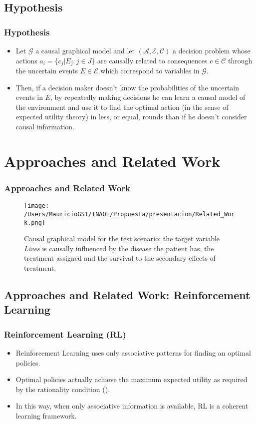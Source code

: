 \documentclass{beamer}
\theoremstyle{plain}
\begin{document}
	\subsection{Hypothesis}
	\begin{frame}
	\frametitle{Hypothesis}
	\begin{itemize}
	\item Let $\mathcal{G}$ a causal graphical model and let $(\mathcal{A},\mathcal{E},\mathcal{C})$ a decision problem whose actions $a_i = \{ c_j | E_j : j \in J \}$  are causally related to consequences $c \in \mathcal{C}$ through the uncertain events $E \in \mathcal{E}$ which correspond to variables in $\mathcal{G}$.
	\item Then, if a decision maker doesn't know the probabilities of the uncertain events in $E$, by repeatedly making decisions he can learn a causal model of the environment and use it to find the optimal action (in the sense of expected utility theory) in less, or equal, rounds than if he doesn't consider causal information.
	\end{itemize}
	\end{frame}

\section{Approaches and Related Work}
\begin{frame}
\frametitle{Approaches and Related Work}
\begin{figure}[ht]
\vskip 0.2in
\begin{center}
\texttt{[image: /Users/MauricioGS1/INAOE/Propuesta/presentacion/Related\_Work.png]}
\caption{Causal graphical model for the test scenario: the target variable \textit{Lives} is causally influenced by the disease the patient has, the treatment assigned and the survival to the secondary effects of treatment.}
\label{causal_model}
\end{center}
\vskip -0.2in
\end{figure}
\end{frame} 
\subsection{Approaches and Related Work: Reinforcement Learning}
\begin{frame}
\frametitle{Reinforcement Learning (RL)}
\begin{itemize}
\item Reinforcement Learning uses only associative patterns for finding an optimal policies.
\item Optimal policies actually achieve the maximum expected utility as required by the rationality condition (\cite{webb2007game}).
\item In this way, when only associative information is available, RL is a coherent learning framework. 
\end{itemize}
\end{frame}
\end{document}
